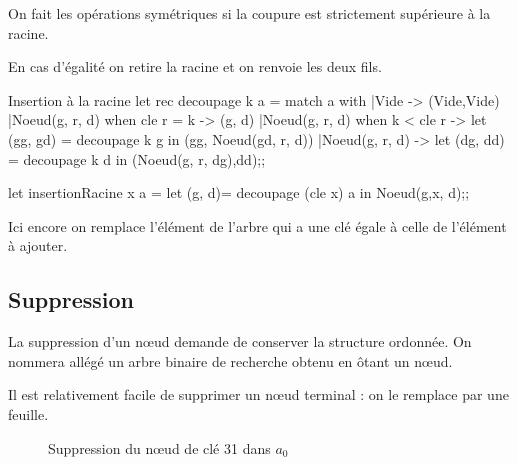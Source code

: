 On fait les opérations symétriques si la coupure est strictement supérieure à la racine.

En cas d'égalité on retire la racine et on renvoie les deux fils. 
\begin{code}{Insertion à la racine}
let rec decoupage k a = 
  match a with
  |Vide -> (Vide,Vide)
  |Noeud(g, r, d) when cle r = k -> (g, d)
  |Noeud(g, r, d) when k < cle r
                  -> let (gg, gd) = decoupage k g 
                      in (gg, Noeud(gd, r, d))
  |Noeud(g, r, d) -> let (dg, dd) = decoupage k d 
                      in (Noeud(g, r, dg),dd);;
                
let insertionRacine x a =
  let (g, d)= decoupage (cle x) a 
  in Noeud(g,x, d);;
\end{code}
Ici encore on remplace l'élément de l'arbre qui a une clé égale à celle de l'élément à ajouter.
\subsection{Suppression}
La suppression d'un nœud demande de conserver la structure ordonnée. On nommera allégé un arbre binaire de recherche obtenu en ôtant un nœud.

Il est relativement facile de supprimer un nœud terminal : on le remplace par une feuille.
\begin{figure*}[h]
\centering
{}
\caption{Suppression du nœud de clé 31 dans $a_0$}
\end{figure*}

